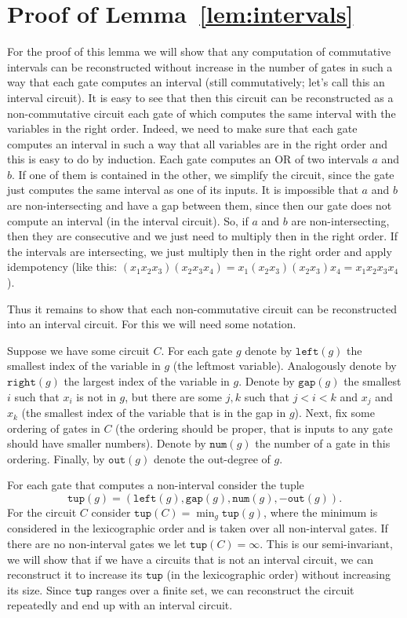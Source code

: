 \documentclass[11pt,letterpaper]{article}
\newcommand{\lef}{\texttt{left}}
\newcommand{\righ}{\texttt{right}}
\newcommand{\gap}{\texttt{gap}}
\newcommand{\num}{\texttt{num}}
\newcommand{\out}{\texttt{out}}
\newcommand{\tup}{\texttt{tup}}
\begin{document}
\section{Proof of Lemma~\ref{lem:intervals}}

For the proof of this lemma we will show that any computation of commutative intervals can be reconstructed without increase in the number of gates in such a way that each gate computes an interval (still commutatively; let's call this an interval circuit). It is easy to see that then this circuit can be reconstructed as a non-commutative circuit each gate of which computes the same interval with the variables in the right order. Indeed, we need to make sure that each gate computes an interval in such a way that all variables are in the right order and this is easy to do by induction. Each gate computes an OR of two intervals $a$ and $b$. If one of them is contained in the other, we simplify the circuit, since the gate just computes the same interval as one of its inputs. It is impossible that $a$ and $b$ are non-intersecting and have a gap between them, since then our gate does not compute an interval (in the interval circuit). So, if $a$ and  $b$ are non-intersecting, then they are consecutive and we just need to multiply then in the right order. If the intervals are intersecting, we just multiply then in the right order and apply idempotency (like this: $(x_1x_2x_3)(x_2x_3x_4)=x_1(x_2x_3)(x_2x_3)x_4=x_1x_2x_3x_4$).

Thus it remains to show that each non-commutative circuit can be reconstructed into an interval circuit. For this we will need some notation.

Suppose we have some circuit $C$. For each gate $g$ denote by $\lef(g)$ the smallest index of the variable in $g$ (the leftmost variable). Analogously denote by $\righ(g)$ the largest index of the variable in $g$. Denote by $\gap(g)$ the smallest $i$ such that $x_i$ is not in $g$, but there are some $j,k$ such that $j<i<k$ and $x_j$ and $x_k$ (the smallest index of the variable that is in the gap in $g$). 
Next, fix some ordering of gates in $C$ (the ordering should be proper, that is inputs to any gate should have smaller numbers). Denote by $\num(g)$ the number of a gate in this ordering. Finally, by $\out(g)$ denote the out-degree of $g$.

For each gate that computes a non-interval consider the tuple 
$$
\tup(g)=(\lef(g),\gap(g),\num(g),-\out(g)).
$$ For the circuit $C$ consider $\tup(C) = \min_g \tup(g)$, where the minimum is considered in the lexicographic order and is taken over all non-interval gates. If there are no non-interval gates we let $\tup(C)=\infty$. This is our semi-invariant, we will show that if we have a circuits that is not an interval circuit, we can reconstruct it to increase  its $\tup$ (in the lexicographic order) without increasing its size. Since $\tup$ ranges over a finite set, we can reconstruct the circuit repeatedly and end up with an interval circuit.
\end{document}
